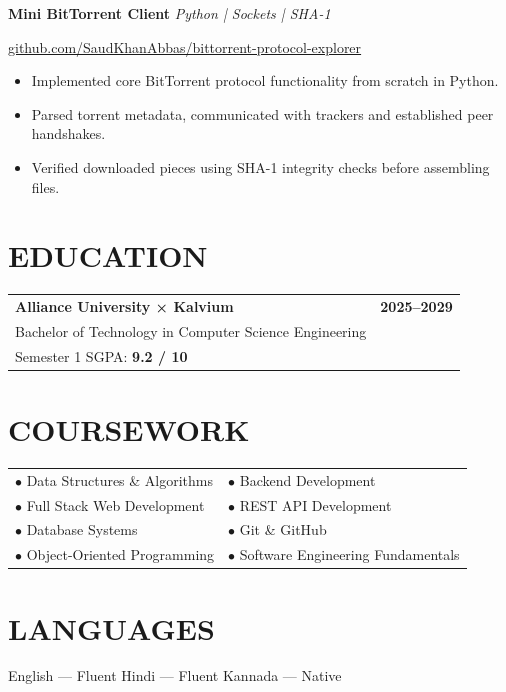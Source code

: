 \documentclass[11pt,a4paper]{article}
\begin{document}
\textbf{Mini BitTorrent Client} \hfill \textit{Python | Sockets | SHA-1}

\href{https://github.com/SaudKhanAbbas/bittorrent-protocol-explorer}{github.com/SaudKhanAbbas/bittorrent-protocol-explorer}

\begin{itemize}
\item Implemented core BitTorrent protocol functionality from scratch in Python.
\item Parsed torrent metadata, communicated with trackers and established peer handshakes.
\item Verified downloaded pieces using SHA-1 integrity checks before assembling files.
\end{itemize}

\section*{EDUCATION}

\begin{tabularx}{\textwidth}{Xr}
\textbf{Alliance University × Kalvium} & \textbf{2025--2029}\\
Bachelor of Technology in Computer Science Engineering & \\
Semester 1 SGPA: \textbf{9.2 / 10} &
\end{tabularx}

\section*{COURSEWORK}
\begin{tabularx}{\textwidth}{X X}
$\bullet$ Data Structures \& Algorithms & $\bullet$ Backend Development\\
$\bullet$ Full Stack Web Development & $\bullet$ REST API Development\\
$\bullet$ Database Systems & $\bullet$ Git \& GitHub\\
$\bullet$ Object-Oriented Programming & $\bullet$ Software Engineering Fundamentals
\end{tabularx}

\section*{LANGUAGES}
English --- Fluent \hfill Hindi --- Fluent \hfill Kannada --- Native
\end{document}
